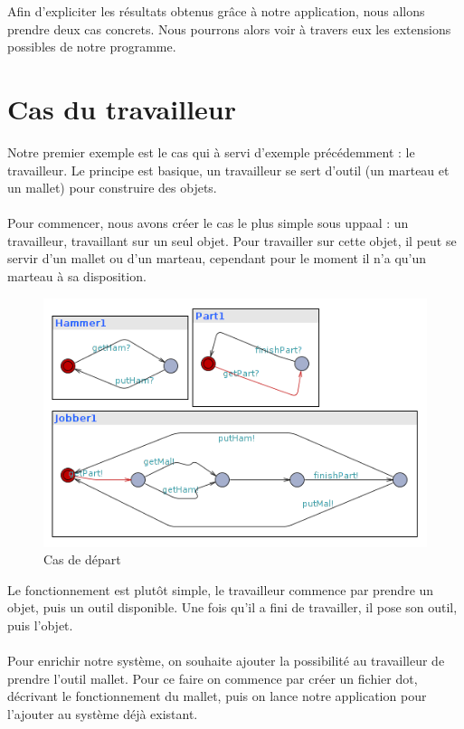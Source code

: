 \documentclass[12pt,a4paper]{report}
\begin{document}
    Afin d'expliciter les résultats obtenus grâce à notre application, nous allons prendre deux cas concrets. Nous pourrons alors voir à travers eux les extensions possibles de notre programme.
    
    \section{Cas du travailleur}
    
    Notre premier exemple est le cas qui à servi d'exemple précédemment : le travailleur. Le principe est basique, un travailleur se sert d'outil (un marteau et un mallet) pour construire des objets.
\\\\
    Pour commencer, nous avons créer le cas le plus simple sous uppaal : un travailleur, travaillant sur un seul objet. Pour travailler sur cette objet, il peut se servir d'un mallet ou d'un marteau, cependant pour le moment il n'a qu'un marteau à sa disposition.

\begin{figure}[H]
  \centering
  \includegraphics[scale=0.6]{ressources/workerBasic.png}
  \caption{Cas de départ}
\end{figure}

    Le fonctionnement est plutôt simple, le travailleur commence par prendre un objet, puis un outil disponible. Une fois qu'il a fini de travailler, il pose son outil, puis l'objet.
\\\\
    Pour enrichir notre système, on souhaite ajouter la possibilité au travailleur de prendre l'outil mallet. Pour ce faire on commence par créer un fichier dot, décrivant le fonctionnement du mallet, puis on lance notre application pour l'ajouter au système déjà existant.
    
\end{document}
